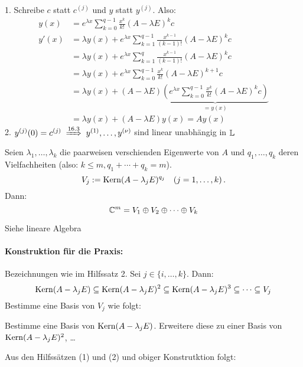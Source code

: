 \documentclass{article}
\begin{document}
\begin{beweis}
1. Schreibe $c$ statt $c^{(j)}$ und $y$ statt $y^{(j)}$. Also:
\begin{align*}
y(x) &= e^{\lambda x} \sum_{k=0}^{q-1} \frac{x^k}{k!} (A-\lambda E)^k c \\
y'(x) &= \lambda y(x) + e^{\lambda x} \sum_{k=1}^{q-1} \frac{x^{k-1}}{(k-1)!} (A-\lambda E)^k c \\
& = \lambda y(x) + e^{\lambda x}  \sum_{k=1}^{q} \frac{x^{k-1}}{(k-1)!} (A-\lambda E)^k c \\
& = \lambda y(x) + e^{\lambda x}  \sum_{k=0}^{q-1} \frac{x^{k}}{k!} (A-\lambda E)^{k+1} c \\
& = \lambda y(x) + (A-\lambda E) \underbrace{\left( e^{\lambda x}  \sum_{k=0}^{q-1} \frac{x^{k}}{k!} (A-\lambda E)^k c\right) }_{=y(x)} \\
& = \lambda y(x) + (A-\lambda E) y(x) = Ay(x)
\end{align*}
2. $y^{(j)}(0) = c^{(j)} \folgtnach{16.3} y^{(1)},\ldots, y^{(\nu)}$ sind linear unabhängig in $\mathbb{L}$
\end{beweis}

\begin{hilfssatz}[2]
Seien $\lambda_1,\ldots,\lambda_k$ die paarweisen verschienden Eigenwerte von $A$ und $q_1,\ldots,q_k$ deren Vielfachheiten (also: $k\le m, q_1+\cdots+q_k=m$). 
\[ V_j := \mathop{\rm Kern}\nolimits (A-\lambda_jE)^{q_j}\quad(j=1,\ldots,k)\,.\]
Dann:
\[\mathbb{C}^m = V_1\oplus V_2 \oplus \cdots \oplus V_k\]
\end{hilfssatz}

\begin{beweis}
Siehe lineare Algebra
\end{beweis}

\paragraph{Konstruktion für die Praxis:}
Bezeichnungen wie im Hilfssatz 2. Sei $j\in\{i,\ldots,k\}$. Dann:
\[\mathop{\rm Kern}\nolimits (A-\lambda_j E)\subseteq \mathop{\rm Kern}\nolimits(A-\lambda_jE)^2\subseteq \mathop{\rm Kern}\nolimits(A-\lambda_jE)^3\subseteq \cdots \subseteq V_j\]
Bestimme eine Basis von $V_j$ wie folgt:

Bestimme eine Basis von $\mathop{\rm Kern}\nolimits(A-\lambda_jE)$. Erweitere diese zu einer Basis von $\mathop{\rm Kern}\nolimits(A-\lambda_jE)^2$, \ldots

Aus den Hilfssätzen (1) und (2) und obiger Konstrutktion folgt:
\end{document}
